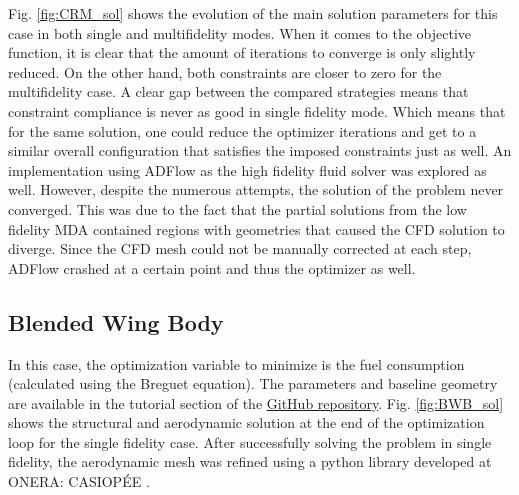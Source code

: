 \documentclass[conf]{new-aiaa}
\begin{document}
Fig. \ref{fig:CRM_sol} shows the evolution of the main solution parameters for this case in both single and multifidelity modes. When it comes to the objective function, it is clear that the amount of iterations to converge is only slightly reduced. On the other hand, both constraints are closer to zero for the multifidelity case. A clear gap between the compared strategies means that constraint compliance is never as good in single fidelity mode. Which means that for the same solution, one could reduce the optimizer iterations and get to a similar overall configuration that satisfies the imposed constraints just as well. 
An implementation using ADFlow as the high fidelity fluid solver was explored as well. However, despite the numerous attempts, the solution of the problem never converged. This was due to the fact that the partial solutions from the low fidelity MDA contained regions with geometries that caused the CFD solution to diverge. Since the CFD mesh could not be manually corrected at each step, ADFlow crashed at a certain point and thus the optimizer as well.

\subsection{Blended Wing Body}
In this case, the optimization variable to minimize is the fuel consumption (calculated using the Breguet equation). The parameters and baseline geometry are available in the tutorial section of the \href{https://github.com/mid2SUPAERO/RP_MAE_GILBERTO_RUIZ_JIMENEZ}{GitHub repository}. Fig. \ref{fig:BWB_sol} shows the structural and aerodynamic solution at the end of the optimization loop for the single fidelity case. After successfully solving the problem in single fidelity, the aerodynamic mesh was refined using a python library developed at ONERA: CASIOPÉE \cite{Benoit2015}. 
\end{document}
